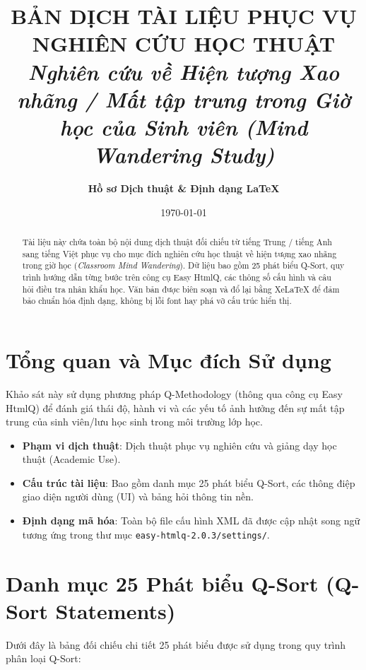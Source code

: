 \documentclass[11pt,a4paper]{article}
\title{\textbf{BẢN DỊCH TÀI LIỆU PHỤC VỤ NGHIÊN CỨU HỌC THUẬT}\\
\large\textit{Nghiên cứu về Hiện tượng Xao nhãng / Mất tập trung trong Giờ học của Sinh viên (Mind Wandering Study)}}
\author{\textbf{Hồ sơ Dịch thuật \& Định dạng LaTeX}}
\date{\today}
\begin{document}
\maketitle

\begin{abstract}
Tài liệu này chứa toàn bộ nội dung dịch thuật đối chiếu từ tiếng Trung / tiếng Anh sang tiếng Việt phục vụ cho mục đích nghiên cứu học thuật về hiện tượng xao nhãng trong giờ học (\textit{Classroom Mind Wandering}). Dữ liệu bao gồm 25 phát biểu Q-Sort, quy trình hướng dẫn từng bước trên công cụ Easy HtmlQ, các thông số cấu hình và câu hỏi điều tra nhân khẩu học. Văn bản được biên soạn và đổ lại bằng XeLaTeX để đảm bảo chuẩn hóa định dạng, không bị lỗi font hay phá vỡ cấu trúc hiển thị.
\end{abstract}

\tableofcontents
\newpage

\section{Tổng quan và Mục đích Sử dụng}
Khảo sát này sử dụng phương pháp Q-Methodology (thông qua công cụ Easy HtmlQ) để đánh giá thái độ, hành vi và các yếu tố ảnh hưởng đến sự mất tập trung của sinh viên/lưu học sinh trong môi trường lớp học.
\begin{itemize}
    \item \textbf{Phạm vi dịch thuật}: Dịch thuật phục vụ nghiên cứu và giảng dạy học thuật (Academic Use).
    \item \textbf{Cấu trúc tài liệu}: Bao gồm danh mục 25 phát biểu Q-Sort, các thông điệp giao diện người dùng (UI) và bảng hỏi thông tin nền.
    \item \textbf{Định dạng mã hóa}: Toàn bộ file cấu hình XML đã được cập nhật song ngữ tương ứng trong thư mục \texttt{easy-htmlq-2.0.3/settings/}.
\end{itemize}

\section{Danh mục 25 Phát biểu Q-Sort (Q-Sort Statements)}

Dưới đây là bảng đối chiếu chi tiết 25 phát biểu được sử dụng trong quy trình phân loại Q-Sort:
\end{document}
